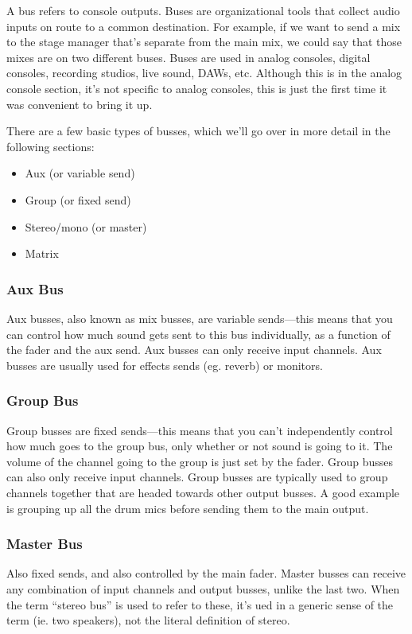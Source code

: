 \documentclass[a4paper]{article}
\begin{document}
A bus refers to console outputs. Buses are organizational tools that collect
audio inputs on route to a common destination. For example, if we want to send
a mix to the stage manager that's separate from the main mix, we could say that
those mixes are on two different buses. Buses are used in analog consoles,
digital consoles, recording studios, live sound, DAWs, etc. Although this is in
the analog console section, it's not specific to analog consoles, this is just
the first time it was convenient to bring it up.

There are a few basic types of busses, which we'll go over in more detail in
the following sections:
\begin{itemize}
	\item Aux (or variable send)
	\item Group (or fixed send)
	\item Stereo/mono (or master)
	\item Matrix
\end{itemize}

\subsubsection{Aux Bus}
Aux busses, also known as mix busses, are variable sends---this means that you
can control how much sound gets sent to this bus individually, as a function of
the fader and the aux send. Aux busses can only receive input channels. Aux
busses are usually used for effects sends (eg. reverb) or monitors.

\subsubsection{Group Bus}
Group busses are fixed sends---this means that you can't independently control
how much goes to the group bus, only whether or not sound is going to it. The
volume of the channel going to the group is just set by the fader. Group busses
can also only receive input channels. Group busses are typically used to group
channels together that are headed towards other output busses. A good example
is grouping up all the drum mics before sending them to the main output.

\subsubsection{Master Bus}
Also fixed sends, and also controlled by the main fader. Master busses can
receive any combination of input channels and output busses, unlike the last
two. When the term ``stereo bus'' is used to refer to these, it's ued in a
generic sense of the term (ie. two speakers), not the literal definition of
stereo.
\end{document}
